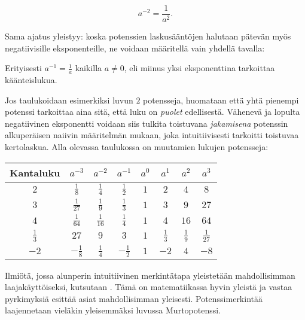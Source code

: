     \begin{equation*}
        a^{-2} = \frac{1}{a^2}.
    \end{equation*}

Sama ajatus yleistyy: koska potenssien laskusääntöjen halutaan pätevän myös negatiivisille eksponenteille, ne voidaan määritellä vain yhdellä tavalla:
  

Erityisesti $a^{-1}=\frac{1}{a}$ kaikilla $a \neq 0$, eli miinus yksi eksponenttina tarkoittaa käänteislukua.
    
\begin{esimerkki}
\end{esimerkki}

\begin{esimerkki}
Jos taulukoidaan esimerkiksi luvun $2$ potensseja, huomataan että yhtä pienempi potenssi tarkoittaa aina sitä, että luku on \emph{puolet} edellisestä. Vähenevä ja lopulta negatiivinen eksponentti voidaan siis tulkita toistuvana \textit{jakamisena} potenssin alkuperäisen naiivin määritelmän mukaan, joka intuitiivisesti tarkoitti toistuvaa kertolaskua. Alla olevassa taulukossa on muutamien lukujen potensseja:
  
\begin{tabular}{c|c c c c c c c}
Kantaluku & $a^{-3}$ & $a^{-2}$ & $a^{-1}$ & $a^0$ & $a^1$ & $a^2$ & $a^3$ \\
\hline
$2$ & $\frac{1}{8}$ & $\frac{1}{4}$ & $\frac{1}{2}$ & $1$ & $2$ & $4$ & $8$ \\
$3$ & $\frac{1}{27}$ & $\frac{1}{9}$ & $\frac{1}{3}$ & $1$ & $3$ & $9$ & $27$ \\
$4$ & $\frac{1}{64}$ & $\frac{1}{16}$ & $\frac{1}{4}$ & $1$ & $4$ & $16$ & $64$ \\
$\frac{1}{3}$ & $27$ & $9$ & $3$ & $1$ & $\frac{1}{3}$ & $\frac{1}{9}$ & $\frac{1}{27}$ \\
$-2$ & $-\frac{1}{8}$ & $\frac{1}{4}$ & $-\frac{1}{2}$ & $1$ & $-2$ & $4$ & $-8$
\end{tabular}
\end{esimerkki}

Ilmiötä, jossa alunperin intuitiivinen merkintätapa yleistetään mahdollisimman laajakäyttöiseksi, kutsutaan . Tämä on matematiikassa hyvin yleistä ja vastaa pyrkimyksiä esittää asiat mahdollisimman yleisesti. Potenssimerkintää laajennetaan vieläkin yleisemmäksi luvussa Murtopotenssi. %